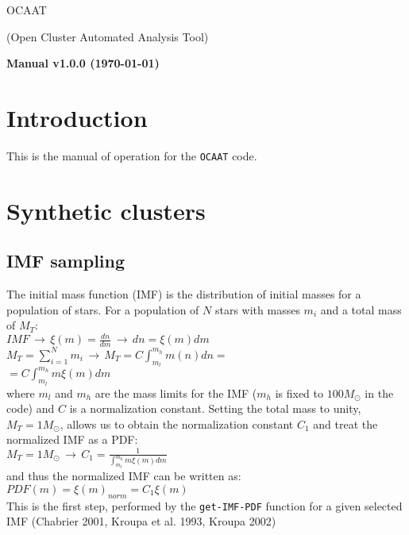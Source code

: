 \documentclass[10pt]{article}
\begin{document}
\begin{center}
\begin{Huge}
OCAAT\\
\end{Huge}
{\huge (Open Cluster Automated Analysis Tool)\\}
\vspace{1cm}
\begin{Large}
\textbf{Manual v1.0.0 (\today)}
\end{Large}
\end{center}

\clearpage

\section{Introduction}
This is the manual of operation for the \texttt{OCAAT} code.

\section{Synthetic clusters}

\subsection{IMF sampling}

The initial mass function (IMF) is the distribution of initial masses for a population
of stars. For a population of $N$ stars with masses $m_i$ and a total mass of $M_T$:\\

$IMF \, \rightarrow \, \xi(m)=\frac{dn}{dm} \, \rightarrow \,dn = \xi(m)dm$\\

$M_T= \sum_{i=1}^N m_i \, \rightarrow \, M_T = C\int_{m_l}^{m_h} m(n)dn = $\\

$= C\int_{m_l}^{m_h} m\xi(m)dm$\\

\noindent where $m_l$ and $m_h$ are the mass limits for the IMF ($m_h$ is fixed to
$100 M_{\odot}$ in the code) and $C$ is a normalization constant. Setting the total
mass to unity, $M_T=1 M_{\odot}$, allows us to obtain the normalization constant $C_1$
and treat the normalized IMF as a PDF:\\

$M_T=1M_{\odot}\, \rightarrow \, C_1 = \frac{1}{\int_{m_l}^{m_h} m\xi(m)dm}$\\

\noindent and thus the normalized IMF can be written as:\\

$PDF(m) = \xi(m)_{norm} = C_1 \xi(m) $\\

This is the first step, performed by the \texttt{get-IMF-PDF} function for a given selected
IMF (Chabrier 2001, Kroupa et al. 1993, Kroupa 2002)\\
\end{document}
